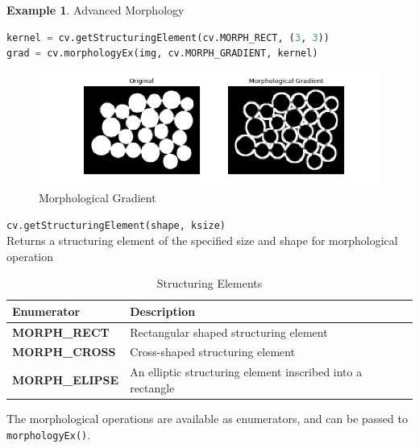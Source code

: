 \documentclass{article}
\theoremstyle{definition}
\newtheorem{ex}{Example}[subsection]
\theoremstyle{remark}
\newcommand{\func}[2]{\noindent\lstinline{#1}\\#2}
\begin{document}
\begin{ex} Advanced Morphology
\begin{lstlisting}[language=Python]
kernel = cv.getStructuringElement(cv.MORPH_RECT, (3, 3))
grad = cv.morphologyEx(img, cv.MORPH_GRADIENT, kernel)
\end{lstlisting}
\begin{figure}[h!]
    \centering
    \includegraphics[width=\textwidth]{ocv_grad}
    \caption{Morphological Gradient}
    \label{fig:ocv_grad}
\end{figure}
\end{ex}

\func{cv.getStructuringElement(shape, ksize)}{Returns a structuring element of the specified size and shape for morphological operation}


\begin{table}[h!]
    \centering
    \def\arraystretch{1.1}%
    \begin{tabular}{ p{5cm} p{7cm} } 
	\hline
	Enumerator & Description \\
	\hline
	\textbf{\footnotesize{MORPH\_RECT}} & Rectangular shaped structuring element \\

	\textbf{\footnotesize{MORPH\_CROSS}} & Cross-shaped structuring element \\

	\textbf{\footnotesize{MORPH\_ELIPSE}} & An elliptic structuring element inscribed into a rectangle \\
	\hline
    \end{tabular}
    \caption{Structuring Elements}
    \label{table:col_struct_el}
\end{table}

The morphological operations are available as enumerators, and can be passed to \lstinline{morphologyEx()}.
\end{document}

